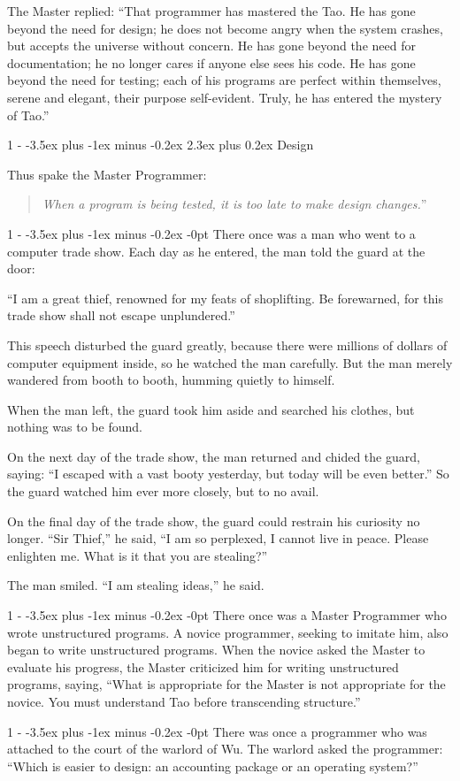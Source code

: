\documentclass[12pt,letterpaper,titlepage]{article}
\makeatletter
\newlength{\intomargin}\setlength{\intomargin}{25pt}
\renewcommand{\section}{%
\@startsection{section}%
{1}%
{-\intomargin}%
{-3.5ex plus -1ex minus -0.2ex}%
{2.3ex plus 0.2ex}%
{\clearpage\normalfont\Large\bfseries\color{my-red}}%
}
\renewcommand{\subsection}{%
\@startsection{subsection}%
{1}%
{-\intomargin}%
{-3.5ex plus -1ex minus -0.2ex}%
{-0pt}%
{\normalfont\normalsize\bfseries\color{my-red}}%
}
\newcommand{\book}[2]{\section{#1}%
\par\hspace{-\intomargin}Thus spake the Master Programmer:%
\begin{quotation}\color{my-gray}\noindent\llap{``}\textsl{#2}''\end{quotation}\medskip}
\newcommand{\sect}{\subsection{}}
\makeatother
\begin{document}
The Master replied: ``That programmer has mastered the Tao. He has
gone beyond the need for design; he does not become angry when the
system crashes, but accepts the universe without concern. He has gone
beyond the need for documentation; he no longer cares if anyone else
sees his code. He has gone beyond the need for testing; each of his
programs are perfect within themselves, serene and elegant, their
purpose self-evident. Truly, he has entered the mystery of Tao.''

\book{Design}%
{When a program is being tested, it is too late to make design changes.}

\sect
There once was a man who went to a computer trade show. Each day as he
entered, the man told the guard at the door:

``I am a great thief, renowned for my feats of shoplifting. Be
forewarned, for this trade show shall not escape unplundered.''

This speech disturbed the guard greatly, because there were millions
of dollars of computer equipment inside, so he watched the man
carefully. But the man merely wandered from booth to booth, humming
quietly to himself.

When the man left, the guard took him aside and searched his clothes,
but nothing was to be found.

On the next day of the trade show, the man returned and chided the
guard, saying: ``I escaped with a vast booty yesterday, but today will
be even better.'' So the guard watched him ever more closely, but to
no avail.

On the final day of the trade show, the guard could restrain his
curiosity no longer. ``Sir Thief,'' he said, ``I am so perplexed, I
cannot live in peace. Please enlighten me. What is it that you are
stealing?''

The man smiled. ``I am stealing ideas,'' he said.

\sect
There once was a Master Programmer who wrote unstructured programs. A
novice programmer, seeking to imitate him, also began to write
unstructured programs. When the novice asked the Master to evaluate
his progress, the Master criticized him for writing unstructured
programs, saying, ``What is appropriate for the Master is not
appropriate for the novice. You must understand Tao before
transcending structure.''

\sect
There was once a programmer who was attached to the court of the
warlord of Wu. The warlord asked the programmer: ``Which is easier to
design: an accounting package or an operating system?''
\end{document}
